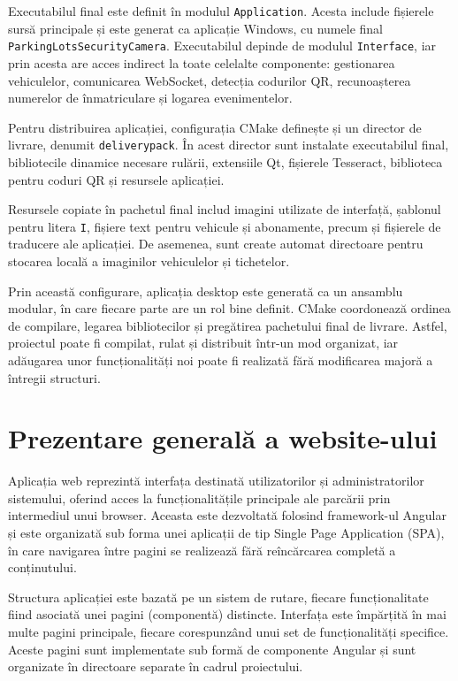 Executabilul final este definit în modulul \texttt{Application}. Acesta include fișierele sursă principale și este generat ca aplicație Windows, cu numele final \texttt{ParkingLotsSecurityCamera}. Executabilul depinde de modulul \texttt{Interface}, iar prin acesta are acces indirect la toate celelalte componente: gestionarea vehiculelor, comunicarea WebSocket, detecția codurilor QR, recunoașterea numerelor de înmatriculare și logarea evenimentelor.

Pentru distribuirea aplicației, configurația CMake definește și un director de livrare, denumit \texttt{deliverypack}. În acest director sunt instalate executabilul final, bibliotecile dinamice necesare rulării, extensiile Qt, fișierele Tesseract, biblioteca pentru coduri QR și resursele aplicației.

Resursele copiate în pachetul final includ imagini utilizate de interfață, șablonul pentru litera \texttt{I}, fișiere text pentru vehicule și abonamente, precum și fișierele de traducere ale aplicației. De asemenea, sunt create automat directoare pentru stocarea locală a imaginilor vehiculelor și tichetelor.

Prin această configurare, aplicația desktop este generată ca un ansamblu modular, în care fiecare parte are un rol bine definit. CMake coordonează ordinea de compilare, legarea bibliotecilor și pregătirea pachetului final de livrare. Astfel, proiectul poate fi compilat, rulat și distribuit într-un mod organizat, iar adăugarea unor funcționalități noi poate fi realizată fără modificarea majoră a întregii structuri.

\section{Prezentare generală a website-ului}

Aplicația web reprezintă interfața destinată utilizatorilor și administratorilor sistemului, oferind acces la funcționalitățile principale ale parcării prin intermediul unui browser. Aceasta este dezvoltată folosind framework-ul Angular și este organizată sub forma unei aplicații de tip Single Page Application (SPA), în care navigarea între pagini se realizează fără reîncărcarea completă a conținutului.

Structura aplicației este bazată pe un sistem de rutare, fiecare funcționalitate fiind asociată unei pagini (componentă) distincte. Interfața este împărțită în mai multe pagini principale, fiecare corespunzând unui set de funcționalități specifice. Aceste pagini sunt implementate sub formă de componente Angular și sunt organizate în directoare separate în cadrul proiectului.

